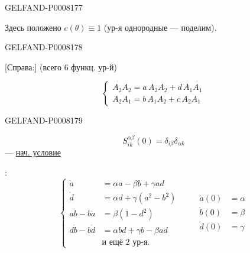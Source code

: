 \begin{GelfandAdjacentEvidence}{GELFAND-P000817}{7}


Здесь положено \(c(\theta)\equiv1\) (ур-я однородные — поделим).
\end{GelfandAdjacentEvidence}
\begin{GelfandAdjacentEvidence}{GELFAND-P000817}{8}


[Справа:] (всего 6 функц. ур-й)

\begin{equation*}
\begin{cases}
A_2A_2=a\,A_2A_2+d\,A_1A_1\\
A_2A_1=b\,A_1A_2+c\,A_2A_1
\end{cases}\tag*{\((5)_2\)}
\end{equation*}
\end{GelfandAdjacentEvidence}
\begin{GelfandAdjacentEvidence}{GELFAND-P000817}{9}


\begin{equation*}
S^{\alpha\beta}_{ik}(0)=\delta_{i\beta}\delta_{\alpha k}\tag{7}
\end{equation*}
— \uline{нач. условие}

:
\begin{equation*}
\left\{
\begin{aligned}
\dot a&=\alpha a-\beta b+\gamma ad\\
\dot d&=\alpha d+\gamma(a^2-b^2)\\
a\dot b-b\dot a&=\beta(1-d^2)\\
d\dot b-b\dot d&=\alpha bd+\gamma b-\beta ad\\
&\text{и ещё 2 ур-я.}
\end{aligned}
\right.
\qquad
\begin{aligned}
\dot a(0)&=\alpha\\
\dot b(0)&=\beta\\
\dot d(0)&=\gamma
\end{aligned}\tag{8}
\end{equation*}
\end{GelfandAdjacentEvidence}



